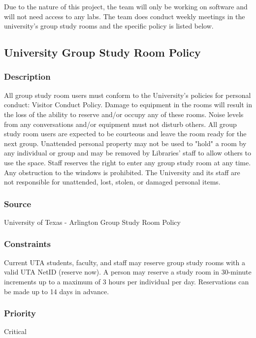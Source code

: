 Due to the nature of this project, the team will only be working on software and will not need access to any labs. The team does conduct weekly meetings in the university's group study rooms and the specific policy is listed below.

\subsection{University Group Study Room Policy}
\subsubsection{Description}
All group study room users must conform to the University's policies for personal conduct: Visitor Conduct Policy. Damage to equipment in the rooms will result in the loss of the ability to reserve and/or occupy any of these rooms. Noise levels from any conversations and/or equipment must not disturb others. All group study room users are expected to be courteous and leave the room ready for the next group. Unattended personal property may not be used to "hold" a room by any individual or group and may be removed by Libraries' staff to allow others to use the space. Staff reserves the right to enter any group study room at any time. Any obstruction to the windows is prohibited. The University and its staff are not responsible for unattended, lost, stolen, or damaged personal items.
\subsubsection{Source}
University of Texas - Arlington Group Study Room Policy
\subsubsection{Constraints}
Current UTA students, faculty, and staff may reserve group study rooms with a valid UTA NetID (reserve now). A person may reserve a study room in 30-minute increments up to a maximum of 3 hours per individual per day. Reservations can be made up to 14 days in advance.

\subsubsection{Priority}
Critical
